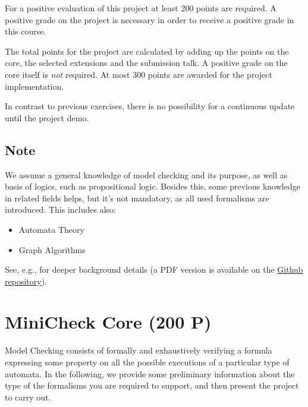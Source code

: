 \documentclass{article}
\begin{document}
For a positive evaluation of this project at least 200 points are required. 
A positive grade on the project is necessary in order to receive a positive grade in this course. 

The total points for the project are calculated by adding up the points on the core, 
the selected extensions and the submission talk. A positive grade on the core itself is \textit{not} required. 
At most 300 points are awarded for the project implementation.

In contrast to previous exercises, there is no possibility for a continuous update until the project demo.

\subsection{Note}
We assume a general knowledge of model checking and its purpose, as well as basis of logics,
such as propositional logic.  Besides this, some previous knowledge in related fields helps, but it's not mandatory,
as all used formalisms are introduced. 
This includes also:
\begin{itemize}
    \item Automata Theory
    \item Graph Algorithms
\end{itemize}
See, e.g., \cite{BaKa} for deeper background details (a PDF version is available on the 
\href{https://github.com/francescopont/MiniCheck.git}{Github repository}).

\section{MiniCheck Core (200 P)}

Model Checking consists of formally and exhaustively verifying a formula expressing some property
on all the possible executions of a particular type of automata. 
In the following, we provide some preliminary information 
about the type of the formalisms you are required to support, 
and then present the project to carry out. 
\end{document}
